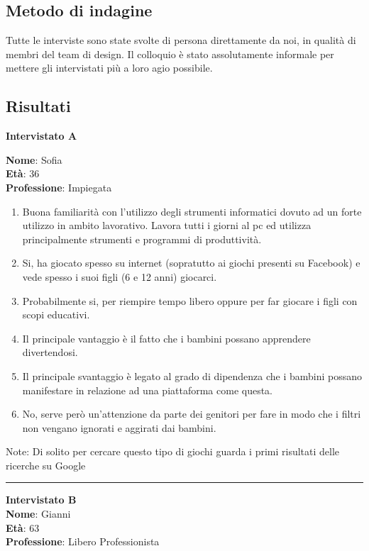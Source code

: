 \documentclass[../Report.tex]{subfiles}
\begin{document}
    \subsection{Metodo di indagine}
    Tutte le interviste sono state svolte di persona direttamente da noi, in qualità di membri del team di design. Il colloquio è stato assolutamente informale per mettere gli intervistati più a loro agio possibile.
    
    \subsection{Risultati}
    \textbf{Intervistato A}

    \textbf{Nome}: Sofia\\
    \textbf{Età}: 36\\
    \textbf{Professione}: Impiegata
    
    \begin{enumerate}
        \item Buona familiarità con l’utilizzo degli strumenti informatici dovuto ad un forte utilizzo in ambito lavorativo. Lavora tutti i giorni al pc ed utilizza principalmente strumenti e programmi di produttività. 
        \item Si, ha giocato spesso su internet (sopratutto ai giochi presenti su Facebook) e vede spesso i suoi figli (6 e 12 anni) giocarci. 
        \item Probabilmente si, per riempire tempo libero oppure per far giocare i figli con scopi educativi.
        \item Il principale vantaggio è il fatto che i bambini possano apprendere divertendosi. 
        \item Il principale svantaggio è legato al grado di dipendenza che i bambini possano manifestare in relazione ad una piattaforma come questa. 
        \item No, serve però un’attenzione da parte dei genitori per fare in modo che i filtri non vengano ignorati e aggirati dai bambini.
    \end{enumerate}

    Note: Di solito per cercare questo tipo di giochi guarda i primi risultati delle ricerche su Google\\

    \hrule
    \vspace{0.5cm}
    \textbf{Intervistato B}\\
    \textbf{Nome}: Gianni\\
    \textbf{Età}: 63\\
    \textbf{Professione}: Libero Professionista
    
\end{document}
